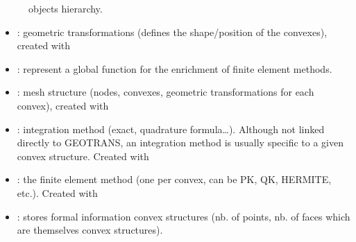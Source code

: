 \documentclass[a4paper,11pt,english]{sphinxmanual}
\begin{document}
\begin{figure}[htbp]
\centering
\capstart

\noindent{}
\caption{ objects hierarchy.}\label{\detokenize{matlab_octave/mlabgf:id1}}\label{\detokenize{matlab_octave/mlabgf:malb-fig-hierarchy}}\end{figure}
\begin{itemize}
\item {} 
\sphinxAtStartPar
{}: geometric transformations (defines the shape/position of
the convexes), created with 

\item {} 
\sphinxAtStartPar
{}: represent a global function for the enrichment of finite element methods.

\item {} 
\sphinxAtStartPar
{} : mesh structure (nodes, convexes, geometric transformations for
each convex), created with 

\item {} 
\sphinxAtStartPar
{} : integration method (exact, quadrature formula…).  Although
not linked directly to GEOTRANS, an integration method is usually specific to a
given convex structure. Created with 

\item {} 
\sphinxAtStartPar
{} : the finite element method (one per convex, can be PK, QK,
HERMITE, etc.). Created with 

\item {} 
\sphinxAtStartPar
{} : stores formal information convex structures (nb. of points,
nb. of faces which are themselves convex structures).


\end{itemize}
\end{document}
